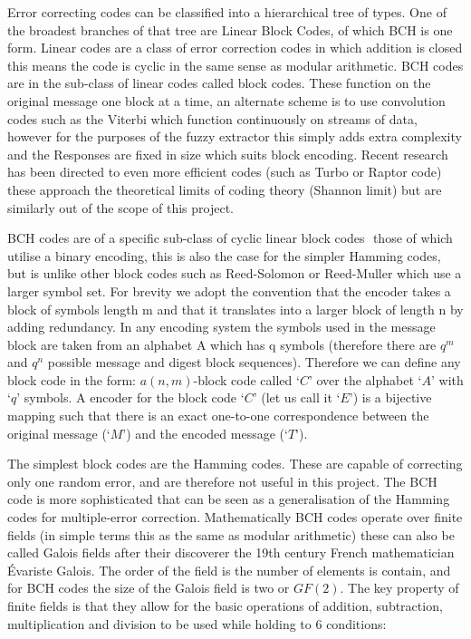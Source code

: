 Error correcting codes can be classified into a hierarchical tree of types.
One of the broadest branches of that tree are Linear Block Codes,
of which BCH is one form.
Linear codes are a class of error correction codes in which addition is
closed this means the code is cyclic in the same sense as modular arithmetic.
BCH codes are in the sub-class of linear codes called block codes.
These function on the original message one block at a time, an alternate scheme
is to use convolution codes such as the Viterbi which function continuously on
streams of data, however for the purposes of the fuzzy extractor this simply
adds extra complexity and the Responses are fixed in size which suits block
encoding.
Recent research has been directed to even more efficient codes (such as Turbo
or Raptor code) these approach the theoretical limits of coding theory
(Shannon limit) but are similarly out of the scope of this project.

BCH codes are of a specific sub-class of cyclic linear block codes  those of
which utilise a binary encoding, this is also the case for the simpler Hamming
codes, but is unlike other block codes such as Reed-Solomon or Reed-Muller
which use a larger symbol set.
For brevity we adopt the convention that the encoder takes a block of symbols
length m and that it translates into a larger block of length n by adding
redundancy.
In any encoding system the symbols used in the message block are taken from an
alphabet A which has q symbols (therefore there are $q^{m}$ and $q^{n}$
possible message and digest block sequences).
Therefore we can define any block code in the form: $a (n, m)$-block code called
$C$ over the alphabet $A$ with $q$ symbols. A encoder for the block code
$C$ (let us call it $E$) is a bijective mapping such that there is an exact
one-to-one correspondence between the original message ($M$) and the encoded
message ($T$).

The simplest block codes are the Hamming codes.
These are capable of correcting only one random error, and are therefore not
useful in this project.
The BCH code is more sophisticated that can be seen as a generalisation of the
Hamming codes for multiple-error correction.
Mathematically BCH codes operate over finite fields (in simple terms this as the
same as modular arithmetic) these can also be called Galois fields after their
discoverer the 19th century French mathematician Évariste Galois.
The order of the field is the number of elements is contain, and for BCH codes
the size of the Galois field is two or $GF(2)$. The key property of finite
fields is that they allow for the basic operations of addition, subtraction,
multiplication and division to be used while holding to 6 conditions:

